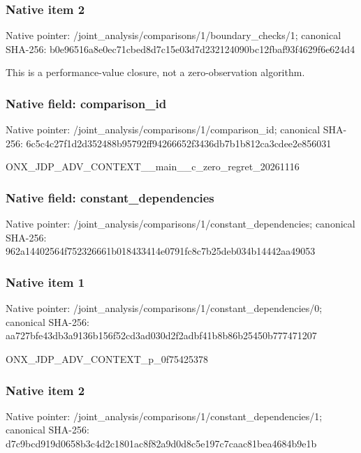 \documentclass[10pt,a4paper]{article}
\begin{document}
\subsubsection{Native item 2}
Native pointer: /joint\_\allowbreak{}analysis/comparisons/1/boundary\_\allowbreak{}checks/1; canonical SHA-256: b0e96516a8e0ec71cbed8d7c15e03d7d232124090bc12fbaf93f4629f6e624d4

\begingroup\raggedright\sloppy This is a performance-value closure,\allowbreak{} not a zero-observation algorithm.\par\endgroup

\subsubsection{Native field: comparison\_\allowbreak{}id}
Native pointer: /joint\_\allowbreak{}analysis/comparisons/1/comparison\_\allowbreak{}id; canonical SHA-256: 6c5c4c27f1d2d352488b95792ff94266652f3436db7b1b812ca3cdee2e856031

\begingroup\raggedright\sloppy ONX\_\allowbreak{}JDP\_\allowbreak{}ADV\_\allowbreak{}CONTEXT\_\allowbreak{}\_\allowbreak{}main\_\allowbreak{}\_\allowbreak{}c\_\allowbreak{}zero\_\allowbreak{}regret\_\allowbreak{}20261116\par\endgroup

\subsubsection{Native field: constant\_\allowbreak{}dependencies}
Native pointer: /joint\_\allowbreak{}analysis/comparisons/1/constant\_\allowbreak{}dependencies; canonical SHA-256: 962a14402564f752326661b018433414e0791fc8c7b25deb034b14442aa49053

\subsubsection{Native item 1}
Native pointer: /joint\_\allowbreak{}analysis/comparisons/1/constant\_\allowbreak{}dependencies/0; canonical SHA-256: aa727bfe43db3a9136b156f52cd3ad030d2f2adbf41b8b86b25450b777471207

\begingroup\raggedright\sloppy ONX\_\allowbreak{}JDP\_\allowbreak{}ADV\_\allowbreak{}CONTEXT\_\allowbreak{}p\_\allowbreak{}0f75425378\par\endgroup

\subsubsection{Native item 2}
Native pointer: /joint\_\allowbreak{}analysis/comparisons/1/constant\_\allowbreak{}dependencies/1; canonical SHA-256: d7c9bcd919d0658b3c4d2c1801ac8f82a9d0d8c5e197c7caac81bea4684b9e1b
\end{document}
